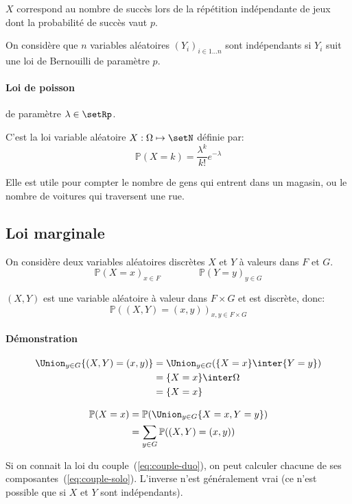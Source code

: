 \documentclass[a4paper,10pt,french,openany]{memoir}
\newcommand{\Proba}{\mathbb{P}}
\begin{document}
$X$ correspond au nombre de succès lors de la répétition indépendante de jeux dont la probabilité de succès vaut $p$.

On considère que $n$ variables aléatoires $(Y_i)_{i\in 1\dots n}$ sont indépendants si $Y_i$ suit une loi de Bernouilli de paramètre $p$.

\paragraph{Loi de poisson} de paramètre $\lambda \in \setRp$.

C'est la loi variable aléatoire $X: \Omega \mapsto \setN$ définie par:
\[\Proba(X=k)=\frac{\lambda^k}{k!} e^{-\lambda}\]

Elle est utile pour compter le nombre de gens qui entrent dans un magasin, ou le nombre de voitures qui traversent une rue.

\subsection{Loi marginale}

On considère deux variables aléatoires discrètes $X$ et $Y$ à valeurs dans $F$ et $G$.
\begin{equation} \Proba(X=x)_{x\in F} \qquad\qquad \Proba(Y=y)_{y\in G} \label{eq:couple-solo}\end{equation}

$(X,Y)$ est une variable aléatoire à valeur dans $F \times G$ et est discrète, donc:
\begin{equation} \Proba((X,Y)=(x,y))_{x,y \in F \times G} \label{eq:couple-duo}\end{equation}

\paragraph{Démonstration}
\begin{align*}
 \Union_{y\in G} \{(X,Y)=(x,y)\} &= \Union_{y\in G} (\{X=x\}\inter\{Y=y\})\\
    &= \{X=x\}\inter \Omega\\
    &= \{X=x\}
\end{align*}

\begin{align*}
 \Proba(X=x) &= \Proba(\Union_{y\in G} \{X=x,Y=y\}) \\
    &= \sum_{y\in G} \Proba((X,Y)=(x,y))
\end{align*}

Si on connait la loi du couple~(\ref{eq:couple-duo}), on peut calculer chacune de ses composantes~(\ref{eq:couple-solo}). L'inverse n'est généralement vrai (ce n'est possible que si $X$ et $Y$ sont indépendants).
\end{document}
